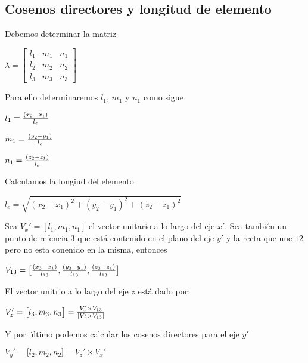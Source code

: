 \documentclass{article}
\begin{document}
    
    \subsection{Cosenos directores y longitud de
elemento}\label{cosenos-directores-y-longitud-de-elemento}

Debemos determinar la matriz

$\lambda = \left[\begin{matrix} l_1 & m_1 & n_1 \\ l_2 & m_2 & n_2 \\ l_3 & m_3 & n_3 \end{matrix}\right]$

Para ello determinaremos $l_1$, $m_1$ y $n_1$ como sigue

$l_1 = {(x_2 - x_1) \over l_e}$

$m_1 = {(y_2 - y_1) \over l_e}$

$n_1 = {(z_2 - z_1) \over l_e}$

Calculamos la longiud del elemento

$l_e = \sqrt{{(x_2 - x_1)}^2 + {(y_2 - y_1)}^2 + {(z_2 - z_1)}^2}$

Sea $V_x' = [l_1, m_1, n_1]$ el vector unitario a lo largo del eje $x'$.
Sea también un punto de refencia 3 que está contenido en el plano del
eje $y'$ y la recta que une $12$ pero no esta conenido en la misma,
entonces

$V_{13} = \big[{{(x_3 - x_1) \over l_{13}},{(y_3 - y_1) \over l_{13}},{(z_3 - z_1) \over l_{13}}}\big]$

El vector unitrio a lo largo del eje $z$ está dado por:

$V_z' = \big[{l_3, m_3, n_3}\big] = {{V_x' \times  V_{13}} \over {|V_x' \times V_{13}|}}$

Y por último podemos calcular los cosenos directores para el eje $y'$

$V_y' = \big[{l_2, m_2, n_2}\big] =  V_z' \times V_x'$
\end{document}
